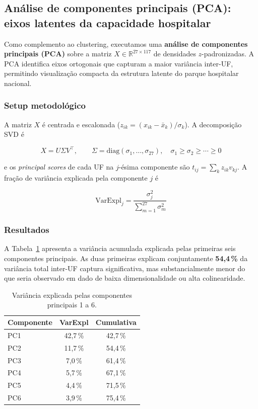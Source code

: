 \documentclass[12pt,a4paper,oneside]{article}
\begin{document}
\subsection{Análise de componentes principais (PCA): eixos
latentes da capacidade hospitalar}\label{sub:ml-pca}

Como complemento ao clustering, executamos uma \textbf{análise de
componentes principais (PCA)} sobre a matriz $X \in
\mathbb{R}^{27 \times 117}$ de densidades $z$-padronizadas. A
PCA identifica eixos ortogonais que capturam a maior variância
inter-UF, permitindo visualização compacta da estrutura latente
do parque hospitalar nacional.

\subsubsection{Setup metodológico}

A matriz $X$ é centrada e escalonada
($z_{ik} = (x_{ik} - \bar{x}_k)/\sigma_k$). A decomposição
SVD é

\begin{equation}
X = U \Sigma V^\top, \qquad
\Sigma = \mathrm{diag}(\sigma_1, \ldots, \sigma_{27}),
\quad \sigma_1 \geq \sigma_2 \geq \cdots \geq 0
\label{eq:svd}
\end{equation}

\noindent
e os \textit{principal scores} de cada UF na $j$-ésima componente
são $t_{ij} = \sum_k z_{ik} v_{kj}$. A fração de variância
explicada pela componente $j$ é

\begin{equation}
\mathrm{VarExpl}_j = \frac{\sigma_j^2}{\sum_{m=1}^{27}\sigma_m^2}
\label{eq:varexpl}
\end{equation}

\subsubsection{Resultados}

A Tabela~\ref{tab:pca-varexpl} apresenta a variância acumulada
explicada pelas primeiras seis componentes principais. As duas
primeiras explicam conjuntamente \textbf{54,4\,\%} da variância
total inter-UF \textemdash{} captura significativa, mas
substancialmente menor do que seria observado em dado de baixa
dimensionalidade ou alta colinearidade.

\begin{table}[htbp]
\centering
\caption{Variância explicada pelas componentes principais 1 a 6.}
\label{tab:pca-varexpl}
\small
\begin{tabular}{l c c}
\toprule
\textbf{Componente} & \textbf{VarExpl} & \textbf{Cumulativa} \\
\midrule
PC1 & 42{,}7\,\% & 42{,}7\,\% \\
PC2 & 11{,}7\,\% & 54{,}4\,\% \\
PC3 &  7{,}0\,\% & 61{,}4\,\% \\
PC4 &  5{,}7\,\% & 67{,}1\,\% \\
PC5 &  4{,}4\,\% & 71{,}5\,\% \\
PC6 &  3{,}9\,\% & 75{,}4\,\% \\
\bottomrule
\end{tabular}
\end{table}
\end{document}
